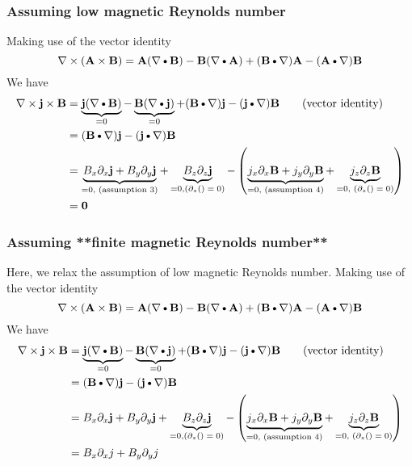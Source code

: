 \documentclass[11pt]{article}
\newcommand{\DOT}{\text{\textbullet}}
\newcommand{\B}{\mathbf{B}}
\newcommand{\A}{\mathbf{A}}
\newcommand{\J}{\mathbf{j}}
\newcommand{\PD}{\partial}
\begin{document}
\subsubsection{Assuming low magnetic Reynolds number}
Making use of the vector identity
\begin{equation*}
	\nabla \times (\A \times \B) = \A (\nabla \DOT \B) - \B (\nabla \DOT \A) + (\B \DOT \nabla) \A - (\A \DOT \nabla) \B
\end{equation*}
We have
\begin{align}
	\nabla \times \J \times \B
	& = \underbrace{\J (\nabla \DOT \B)}_{=0} - 
	    \underbrace{\B (\nabla \DOT \J)}_{=0} + 
	    (\B \DOT \nabla) \J - 
	    (\J \DOT \nabla) \B \notag \qquad \text{(vector identity)} \\
	& = (\B \DOT \nabla) \J - (\J \DOT \nabla) \B \notag \\
	& = \underbrace{B_x \PD_x \J + B_y \PD_y \J}_{=0,\text{ (assumption 3)}} + \underbrace{B_z \PD_z \J}_{=0, \text{($\PD_z()=0$)}}
	- \left( \underbrace{j_x \PD_x \B + j_y \PD_y \B}_{=0, \text{ (assumption 4)}} + \underbrace{j_z \PD_z \B}_{=0, \text{ ($\PD_z()=0$)}} \right) \notag \\
	& = \mathbf{0}
\end{align}

\subsubsection{Assuming **finite magnetic Reynolds number**}
Here, we relax the assumption of low magnetic Reynolds number. Making use of the vector identity
\begin{equation*}
	\nabla \times (\A \times \B) = \A (\nabla \DOT \B) - \B (\nabla \DOT \A) + (\B \DOT \nabla) \A - (\A \DOT \nabla) \B
\end{equation*}
We have
\begin{align}
	\nabla \times \J \times \B
	& = \underbrace{\J (\nabla \DOT \B)}_{=0} - 
	    \underbrace{\B (\nabla \DOT \J)}_{=0} + 
	    (\B \DOT \nabla) \J - 
	    (\J \DOT \nabla) \B \notag \qquad \text{(vector identity)} \\
	& = (\B \DOT \nabla) \J - (\J \DOT \nabla) \B \notag \\
	& = B_x \PD_x \J + B_y \PD_y \J + \underbrace{B_z \PD_z \J}_{=0, \text{($\PD_z()=0$)}}
	- \left( \underbrace{j_x \PD_x \B + j_y \PD_y \B}_{=0, \text{ (assumption 4)}} + \underbrace{j_z \PD_z \B}_{=0, \text{ ($\PD_z()=0$)}} \right) \notag \\
	& = B_x \PD_x j + B_y \PD_y j
\end{align}
\end{document}
